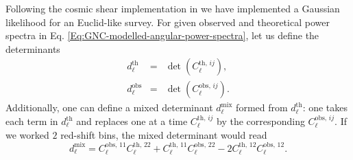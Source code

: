 Following the cosmic shear implementation in  we have implemented a Gaussian likelihood for an Euclid-like survey. For given observed and theoretical power spectra in Eq. \eqref{Eq:GNC-modelled-angular-power-spectra}, let us define the determinants
\begin{eqnarray}
\label{Eq:determinants-Gaussian-likelihood}
d_\ell^{\mathrm{th}} & = & \det \left( C_\ell^{\mathrm{th},\,ij}\right),\\
d_\ell^{\mathrm{obs}} & = & \det \left( C_\ell^{\mathrm{obs},\,ij}\right). 
\end{eqnarray}
Additionally, one can define a mixed determinant $d_\ell^{\mathrm{mix}}$ formed from $d_\ell^{\mathrm{th}}$: one takes each term in $d_\ell^{\mathrm{th}}$ and replaces one at a time $C_\ell^{\mathrm{th},\,ij}$ by the corresponding $C_\ell^{\mathrm{obs},\,ij}$. If we worked $2$ red-shift bins, the mixed determinant would read
\begin{equation}
\label{Eq:example-mixed-determinant}
d_\ell^{\mathrm{mix}} = C_\ell^{\mathrm{obs},\,11}C_\ell^{\mathrm{th},\,22} + C_\ell^{\mathrm{th},\,11}C_\ell^{\mathrm{obs},\,22} - 2 C_\ell^{\mathrm{th},\,12}C_\ell^{\mathrm{obs},\,12}.
\end{equation}
                        
